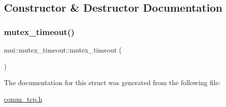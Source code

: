 \subsection{Constructor \& Destructor Documentation}
\mbox{\label{structmui_1_1mutex__timeout_adb40b0f731b2d2b87fed031e10356f38}} 
\subsubsection{\texorpdfstring{mutex\+\_\+timeout()}{mutex\_timeout()}}
{\footnotesize\ttfamily mui\+::mutex\+\_\+timeout\+::mutex\+\_\+timeout (\begin{DoxyParamCaption}{ }\end{DoxyParamCaption})\hspace{0.3cm}{\ttfamily [inline]}}



The documentation for this struct was generated from the following file\+:\begin{DoxyCompactItemize}
\item 
\hyperlink{comm__tcp_8h}{comm\+\_\+tcp.\+h}\end{DoxyCompactItemize}
